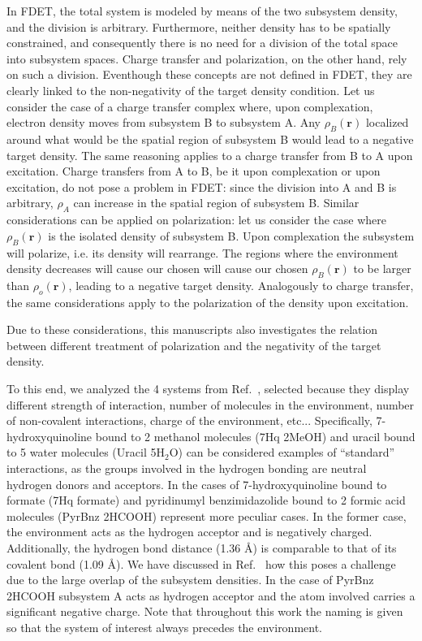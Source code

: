 \documentclass[journal=jctcce,manuscript=article, layout=twocolumn]{achemso}
\begin{document}
In FDET, the total system is modeled by means of the two subsystem density, and the division is arbitrary. Furthermore, neither density has to be spatially constrained, and consequently there is no need for a division of the total space into subsystem spaces. Charge transfer and polarization, on the other hand, rely on such a division. Eventhough these concepts are not defined in FDET, they are clearly linked to the non-negativity of the target density condition.
Let us consider the case of a charge transfer complex where, upon complexation, electron density moves from subsystem B to subsystem A. Any $\rho_B(\mathbf{r})$ localized around what would be the spatial region of subsystem B would lead to a negative target density. The same reasoning applies to a charge transfer from B to A upon excitation.
Charge transfers from A to B, be it upon complexation or upon excitation, do not pose a problem in FDET: since the division into A and B is arbitrary, $\rho_A$ can increase in the spatial region of subsystem B.
Similar considerations can be applied on polarization: let us consider the case where $\rho_B(\mathbf{r})$ is the isolated density of subsystem B. Upon complexation the subsystem will polarize, i.e. its density will rearrange. The regions where the environment density decreases will cause our chosen will cause our chosen $\rho_B(\mathbf{r})$ to be larger than $\rho_o(\mathbf{r})$, leading to a negative target density. Analogously to charge transfer, the same considerations apply to the polarization of the density upon excitation.

Due to these considerations, this manuscripts also investigates the relation between different treatment of polarization and the negativity of the target density.

To this end, we analyzed the 4 systems from Ref.~, selected because they display different strength of interaction, number of molecules in the environment, number of non-covalent interactions, charge of the environment, etc...
Specifically, 7-hydroxyquinoline bound to 2 methanol molecules (7Hq 2MeOH) and uracil bound to 5 water molecules (Uracil 5H$_2$O) can be considered examples of ``standard'' interactions, as the groups involved in the hydrogen bonding are neutral hydrogen donors and acceptors. In the cases of 7-hydroxyquinoline bound to formate (7Hq formate) and pyridinumyl benzimidazolide bound to 2 formic acid molecules (PyrBnz 2HCOOH) represent more peculiar cases. In the former case, the environment acts as the hydrogen acceptor and is negatively charged. Additionally, the hydrogen bond distance (1.36 \AA) is comparable to that of its covalent bond (1.09 \AA). We have discussed in Ref.~ how this poses a challenge due to the large overlap of the subsystem densities. In the case of PyrBnz 2HCOOH subsystem A acts as hydrogen acceptor and the atom involved carries a significant negative charge.
Note that throughout this work the naming is given so that the system of interest always precedes the environment.
\end{document}
